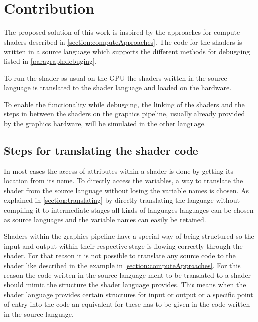 

\chapter{Contribution}\label{cha:Contribution}

The proposed solution of this work is inspired by the approaches for compute shaders described in \autoref{section:computeApproaches}. The code for the shaders is written in a source language which supports the different methods for debugging listed in \autoref{paragraph:debuging}.

To run the shader as usual on the GPU the shaders written in the source language is translated to the shader language and loaded on the hardware.

To enable the functionality while debugging, the linking of the shaders and the steps in between the shaders on the graphics pipeline, usually already provided by the graphics hardware, will be simulated in the other language.

\section{Steps for translating the shader code}
\label{section:contribution_translating}

In most cases the access of attributes within a shader is done by getting its location from its name. To directly access the variables, a way to translate the shader from the source language without losing the variable names is chosen. As explained in \autoref{section:translating} by directly translating the language without compiling it to intermediate stages all kinds of languages languages can be chosen as source languages and the variable names can easily be retained.

Shaders within the graphics pipeline have a special way of being structured so the input and output within their respective stage is flowing correctly through the shader. For that reason it is not possible to translate any source code to the shader like described in the example in  \autoref{section:computeApproaches}. For this reason the code written in the source language ment to be translated to a shader should mimic the structure the shader language provides. This means when the shader language provides certain structures for input or output or a specific point of entry into the code an equivalent for these has to be given in the code written in the source language.

